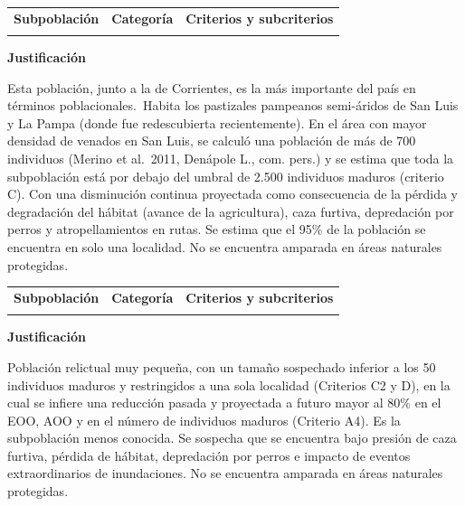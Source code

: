 \documentclass[
  x11names]{article}
\begin{document}
\begin{tabu} to 
\toprule
\textbf{Subpoblación} & \textbf{Categoría} & \textbf{Criterios y subcriterios}\\
\midrule
{} &  & \\
\bottomrule
\end{tabu}

\textbf{Justificación}

Esta población, junto a la de Corrientes, es la más importante del país
en términos poblacionales.~Habita los pastizales pampeanos semi-áridos
de San Luis y La Pampa (donde fue redescubierta recientemente). En el
área con mayor densidad de venados en San Luis, se calculó una población
de más de 700 individuos (Merino et al.~2011, Denápole L., com. pers.) y
se estima que toda la subpoblación está por debajo del umbral de 2.500
individuos maduros (criterio C). Con una disminución continua proyectada
como consecuencia de la pérdida y degradación del hábitat (avance de la
agricultura), caza furtiva, depredación por perros y atropellamientos en
rutas. Se estima que el 95\% de la población se encuentra en solo una
localidad. No se encuentra amparada en áreas naturales
protegidas.\vspace{0.5cm}

\begin{tabu} to 
\toprule
\textbf{Subpoblación} & \textbf{Categoría} & \textbf{Criterios y subcriterios}\\
\midrule
{} &  & \\
\bottomrule
\end{tabu}

\textbf{Justificación}

Población relictual muy pequeña, con un tamaño sospechado inferior a los
50 individuos maduros y restringidos a una sola localidad (Criterios C2
y D), en la cual se infiere una reducción pasada y proyectada a futuro
mayor al 80\% en el EOO, AOO y en el número de individuos maduros
(Criterio A4). Es la subpoblación menos conocida. Se sospecha que se
encuentra bajo presión de caza furtiva, pérdida de hábitat, depredación
por perros e impacto de eventos extraordinarios de inundaciones. No se
encuentra amparada en áreas naturales protegidas.\vspace{0.5cm}
\end{document}
